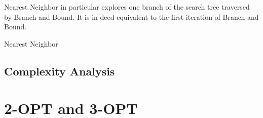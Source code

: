     Nearest Neighbor in particular explores one branch of the search tree traversed by Branch and Bound. It is in deed equivalent to the first iteration of Branch and Bound. 
        \begin{algorithm}
        \caption{Nearest Neighbor}
        \label{algo:nearest-neighbor}
            \DontPrintSemicolon
             
    \end{algorithm}

    \subsection{Complexity Analysis}
    
    

    \section{2-OPT and 3-OPT}
